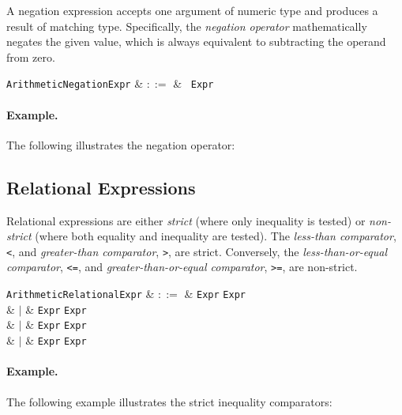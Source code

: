 A negation expression accepts one argument of numeric type and produces a result of matching type.  Specifically, the {\em negation operator} mathematically negates the given value, which is always equivalent to subtracting the operand from zero.

\begin{syntax}
\verb+ArithmeticNegationExpr+ & $::=$ & \token{-}\ \verb+Expr+\\
\end{syntax}

\paragraph{Example.} The following illustrates the negation operator:




\subsection{Relational Expressions}
\label{c_expr_relational}
Relational expressions are either {\em strict} (where only inequality is tested)  or {\em non-strict} (where both equality and inequality are tested).  The {\em less-than comparator}, \lstinline{<}, and {\em greater-than comparator}, \lstinline{>}, are strict.  Conversely, the {\em less-than-or-equal comparator}, \lstinline{<=}, and {\em greater-than-or-equal comparator}, \lstinline{>=}, are non-strict.

\begin{syntax}
  \verb+ArithmeticRelationalExpr+ & $::=$ & \verb+Expr+ \token{<} \verb+Expr+\\
  & $|$ & \verb+Expr+ \token{<=} \verb+Expr+\\
  & $|$ & \verb+Expr+ \token{=>} \verb+Expr+\\
  & $|$ & \verb+Expr+ \token{>} \verb+Expr+\\
\end{syntax}

\paragraph{Example.} The following example illustrates the strict inequality comparators:

